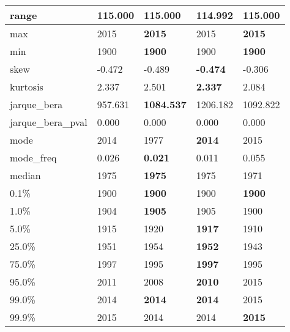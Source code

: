 \begin{table}[H]
\begin{tabular}{|l|m{10em}|m{10em}|m{10em}|m{10em}|}
\hline range & 115.000 & \bfseries 115.000 & \cellcolor[rgb]{0.9, 0.54, 0.52} 114.992 & \bfseries 115.000 \\
\hline max & 2015 & \bfseries 2015 & \cellcolor[rgb]{0.9, 0.54, 0.52} 2015 & \bfseries 2015 \\
\hline min & 1900 & \bfseries 1900 & \cellcolor[rgb]{0.9, 0.54, 0.52} 1900 & \bfseries 1900 \\
\hline skew & -0.472 & -0.489 & \bfseries -0.474 & \cellcolor[rgb]{0.9, 0.54, 0.52} -0.306 \\
\hline kurtosis & 2.337 & 2.501 & \bfseries 2.337 & \cellcolor[rgb]{0.9, 0.54, 0.52} 2.084 \\
\hline jarque\_bera & 957.631 & \bfseries 1084.537 & \cellcolor[rgb]{0.9, 0.54, 0.52} 1206.182 & 1092.822 \\
\hline jarque\_bera\_pval & 0.000 & 0.000 & 0.000 & 0.000 \\
\hline mode & 2014 & \cellcolor[rgb]{0.9, 0.54, 0.52} 1977 & \bfseries 2014 & 2015 \\
\hline mode\_freq & 0.026 & \bfseries 0.021 & 0.011 & \cellcolor[rgb]{0.9, 0.54, 0.52} 0.055 \\
\hline median & 1975 & \bfseries 1975 & 1975 & \cellcolor[rgb]{0.9, 0.54, 0.52} 1971 \\
\hline 0.1\% & 1900 & \bfseries 1900 & \cellcolor[rgb]{0.9, 0.54, 0.52} 1900 & \bfseries 1900 \\
\hline 1.0\% & 1904 & \bfseries 1905 & 1905 & \cellcolor[rgb]{0.9, 0.54, 0.52} 1900 \\
\hline 5.0\% & 1915 & 1920 & \bfseries 1917 & \cellcolor[rgb]{0.9, 0.54, 0.52} 1910 \\
\hline 25.0\% & 1951 & 1954 & \bfseries 1952 & \cellcolor[rgb]{0.9, 0.54, 0.52} 1943 \\
\hline 75.0\% & 1997 & \cellcolor[rgb]{0.9, 0.54, 0.52} 1995 & \bfseries 1997 & \cellcolor[rgb]{0.9, 0.54, 0.52} 1995 \\
\hline 95.0\% & 2011 & 2008 & \bfseries 2010 & \cellcolor[rgb]{0.9, 0.54, 0.52} 2015 \\
\hline 99.0\% & 2014 & \bfseries 2014 & \bfseries 2014 & \cellcolor[rgb]{0.9, 0.54, 0.52} 2015 \\
\hline 99.9\% & 2015 & \cellcolor[rgb]{0.9, 0.54, 0.52} 2014 & 2014 & \bfseries 2015 \\
\hline
\end{tabular}
\end{table}

